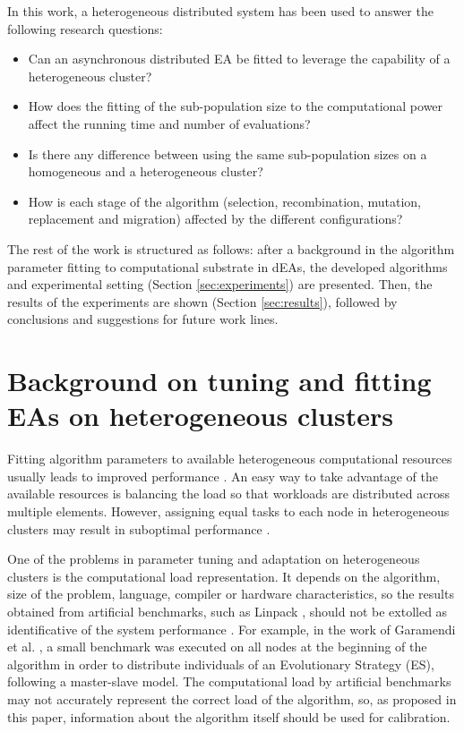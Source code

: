 \documentclass[final,1p,times]{elsarticle}
\begin{document}
In this work, a heterogeneous distributed system has been used to
answer  the following research questions:
\begin{itemize}
 \item Can an asynchronous distributed EA be fitted to leverage the capability of a
   heterogeneous cluster? 
 \item How does the fitting of the sub-population size to the computational power affect the running time and number of evaluations?
 \item Is there any difference between using the same sub-population sizes on a homogeneous and a heterogeneous cluster?
 \item How is each stage of the algorithm (selection, recombination, mutation, replacement and migration) affected by the different
   configurations?
\end{itemize}



The rest of the work is structured as follows: after a background in the algorithm parameter fitting to computational substrate in dEAs, 
 the developed algorithms and experimental setting (Section \ref{sec:experiments}) are presented. 
Then, the results of the experiments are shown (Section \ref{sec:results}), followed by conclusions and suggestions for future work lines.


%
\section{Background on tuning and fitting EAs on heterogeneous clusters}
\label{sec:soa}

Fitting algorithm parameters to available heterogeneous computational resources
usually leads to improved performance
\cite{AutomaticallyConfiguringStyles12}. An easy way to take advantage
of the available resources is  balancing the load
\cite{PARALLELIMPLEMENTATION,Martinez11Nondedicated} so that workloads are distributed across multiple
elements. However, assigning equal tasks  to each node in
heterogeneous clusters may result in suboptimal performance
\cite{LoadBalancingBohn02}. 



One of the problems in parameter tuning and adaptation on heterogeneous clusters is 
the computational load representation. It depends on the algorithm, size of the problem, 
language, compiler or hardware characteristics, so the results obtained from artificial 
benchmarks, such as  Linpack \cite{LinpackEndo10}, should not be extolled as identificative 
of the system performance \cite{LinpackDongarra03}. For example, in the work of Garamendi 
et al. \cite{PARALLELIMPLEMENTATION},  a small benchmark was executed on all nodes at the beginning
of the algorithm in order to distribute individuals of an Evolutionary Strategy
 (ES), following a master-slave model. The computational load by artificial benchmarks may not accurately 
 represent the correct load of the algorithm, so, as proposed in this paper, information 
 about the algorithm itself should be used for calibration.
\end{document}
